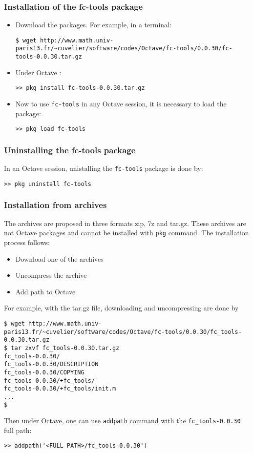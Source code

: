 \subsubsection{Installation of the fc-tools package}

\begin{itemize}
\item Download the packages. For example, in a terminal:
\begin{verbatim}
$ wget http://www.math.univ-paris13.fr/~cuvelier/software/codes/Octave/fc-tools/0.0.30/fc-tools-0.0.30.tar.gz
\end{verbatim}
\item Under Octave :
\begin{verbatim}
>> pkg install fc-tools-0.0.30.tar.gz
\end{verbatim}
\item Now to use \texttt{fc-tools} in any Octave session, it is necessary to load the package:
\begin{verbatim}
>> pkg load fc-tools
\end{verbatim}
\end{itemize}

\subsubsection{Uninstalling the fc-tools package}
In an Octave session, unistalling the \texttt{fc-tools} package is done by:
\begin{verbatim}
>> pkg uninstall fc-tools
\end{verbatim}

\subsubsection{Installation from archives}
The archives are proposed in three formats zip, 7z and tar.gz. These archives are not Octave packages and cannot be installed with \texttt{pkg} command.
The installation process follows:
\begin{itemize}
\item Download one of the archives
\item Uncompress the archive
\item Add path to Octave
\end{itemize}

For example, with the tar.gz file, downloading and uncompressing are done by 
\begin{verbatim}
$ wget http://www.math.univ-paris13.fr/~cuvelier/software/codes/Octave/fc-tools/0.0.30/fc_tools-0.0.30.tar.gz
$ tar zxvf fc_tools-0.0.30.tar.gz
fc_tools-0.0.30/
fc_tools-0.0.30/DESCRIPTION
fc_tools-0.0.30/COPYING
fc_tools-0.0.30/+fc_tools/
fc_tools-0.0.30/+fc_tools/init.m
...
$
\end{verbatim}
Then under Octave, one can use \texttt{addpath} command with the \texttt{fc_tools-0.0.30} full path:
\begin{verbatim}
>> addpath('<FULL PATH>/fc_tools-0.0.30')
\end{verbatim}
 
